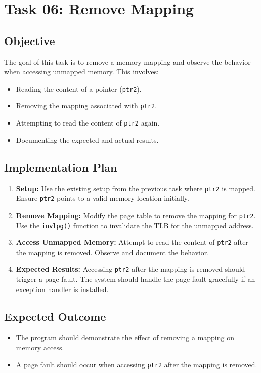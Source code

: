 \documentclass[a4paper,12pt]{report}
\begin{document}
\chapter{Task 06: Remove Mapping}

\section{Objective}
The goal of this task is to remove a memory mapping and observe the behavior when accessing unmapped memory. This involves:
\begin{itemize}
    \item Reading the content of a pointer (\texttt{ptr2}).
    \item Removing the mapping associated with \texttt{ptr2}.
    \item Attempting to read the content of \texttt{ptr2} again.
    \item Documenting the expected and actual results.
\end{itemize}

\section{Implementation Plan}
\begin{enumerate}
    \item \textbf{Setup:} Use the existing setup from the previous task where \texttt{ptr2} is mapped. Ensure \texttt{ptr2} points to a valid memory location initially.
    \item \textbf{Remove Mapping:} Modify the page table to remove the mapping for \texttt{ptr2}. Use the \texttt{invlpg()} function to invalidate the TLB for the unmapped address.
    \item \textbf{Access Unmapped Memory:} Attempt to read the content of \texttt{ptr2} after the mapping is removed. Observe and document the behavior.
    \item \textbf{Expected Results:} Accessing \texttt{ptr2} after the mapping is removed should trigger a page fault. The system should handle the page fault gracefully if an exception handler is installed.
\end{enumerate}

\section{Expected Outcome}
\begin{itemize}
    \item The program should demonstrate the effect of removing a mapping on memory access.
    \item A page fault should occur when accessing \texttt{ptr2} after the mapping is removed.
\end{itemize}
\end{document}
